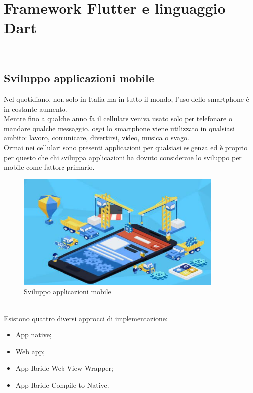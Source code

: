 
\chapter{Framework Flutter e linguaggio Dart}
\label{cap:Framework Flutter e linguaggio Dart}

\\

\section{Sviluppo applicazioni mobile}
Nel quotidiano, non solo in Italia ma in tutto il mondo, l'uso dello smartphone \cite{statistiche} è in costante aumento. \\
Mentre fino a qualche anno fa il cellulare veniva usato solo per telefonare o mandare qualche messaggio, oggi lo smartphone viene utilizzato in qualsiasi ambito: lavoro, comunicare, divertirsi, video, musica o svago. \\
Ormai nei cellulari sono presenti applicazioni per qualsiasi esigenza ed è proprio per questo che chi sviluppa applicazioni ha dovuto considerare lo sviluppo per mobile come fattore primario.\\
	\begin{figure}[htbp]	
	\centering
	\includegraphics[width=10cm]{immagini/sviluppoapp.png}
	\caption{Sviluppo applicazioni mobile}
	\label{fig:Sviluppo applicazioni mobile}
\end{figure}
\\
Esistono quattro diversi approcci di implementazione: 
\begin{itemize}
	\item App native; 
	\item Web app; 
	\item App Ibride Web View Wrapper; 
	\item App Ibride Compile to Native.
\end{itemize}
\cite{sviluppo,differenza,apptonative}

